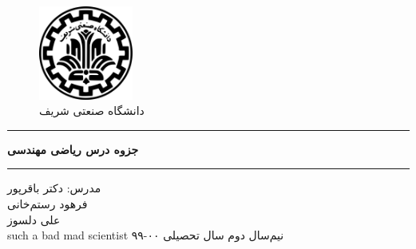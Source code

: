 \begin{center}
	\null
	\vspace{1cm}
\begin{figure}[H]
	\centering
	\includegraphics[width=0.275\textwidth]{sharif-logo-fa.png}
	\caption*{دانشگاه صنعتی شریف\\
		\large{
}
}
\end{figure}
\vspace{1cm}
\hrule
\vspace{.5cm}
\fontsize{26}{26}\textbf{
جزوه درس ریاضی مهندسی\\
}
\vspace{.5cm}
\hrule
\vspace{.5cm}
\vspace{1.5cm}
\normalfont
\Large{
مدرس:
دکتر باقرپور\\}
\vspace{1.5 cm}
\large{
	فرهود رستم‌‌خانی\\
	علی دلسوز\\
	such a bad mad scientist
}
\normalsize
\vfill{نیم‌سال دوم سال تحصیلی ۰۰-۹۹}
\end{center}
\thispagestyle{empty}